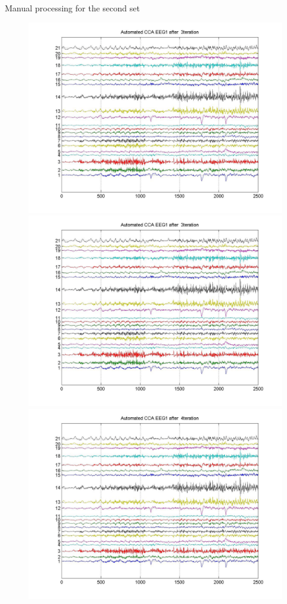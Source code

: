 \documentclass[t,12pt,english
\ifx\beamermode\undefined\else,\beamermode\fi
]{beamer}
\begin{document}
\begin{frame}{Manual processing  for the second set}

\begin{figure}[!htbp]
%
\centering
\includegraphics[width=1\textwidth]{16.jpg}\\
\includegraphics[width=1\textwidth]{16.jpg}
\endminipage\hfill
{}%
\centering
\includegraphics[width=1\textwidth]{19.jpg}\\

\end{figure}
\end{frame}
\end{document}
